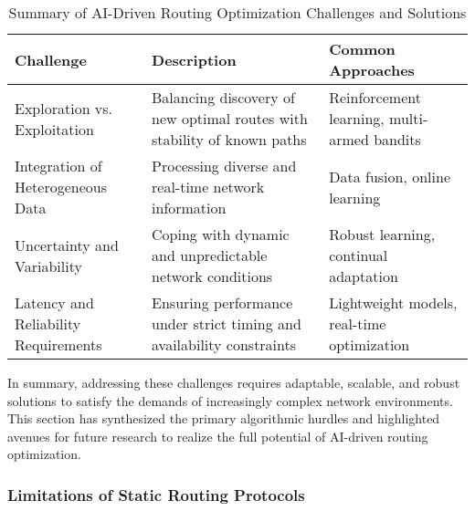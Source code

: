 \documentclass[sigconf]{acmart}
\begin{document}
\begin{table*}[htbp]
\centering
\caption{Summary of AI-Driven Routing Optimization Challenges and Solutions}
\label{tab:ai_routing_challenges}
\begin{adjustbox}{max width=\textwidth}
\begin{tabular}{@{}lll@{}}
\toprule
\textbf{Challenge}                         & \textbf{Description}                                                      & \textbf{Common Approaches}                     \\ \midrule
Exploration vs. Exploitation               & Balancing discovery of new optimal routes with stability of known paths  & Reinforcement learning, multi-armed bandits   \\
Integration of Heterogeneous Data          & Processing diverse and real-time network information                      & Data fusion, online learning                    \\
Uncertainty and Variability                & Coping with dynamic and unpredictable network conditions                  & Robust learning, continual adaptation           \\
Latency and Reliability Requirements       & Ensuring performance under strict timing and availability constraints    & Lightweight models, real-time optimization      \\ \bottomrule
\end{tabular}
\end{adjustbox}
\end{table*}

In summary, addressing these challenges requires adaptable, scalable, and robust solutions to satisfy the demands of increasingly complex network environments. This section has synthesized the primary algorithmic hurdles and highlighted avenues for future research to realize the full potential of AI-driven routing optimization.

\subsubsection{Limitations of Static Routing Protocols}
\end{document}
